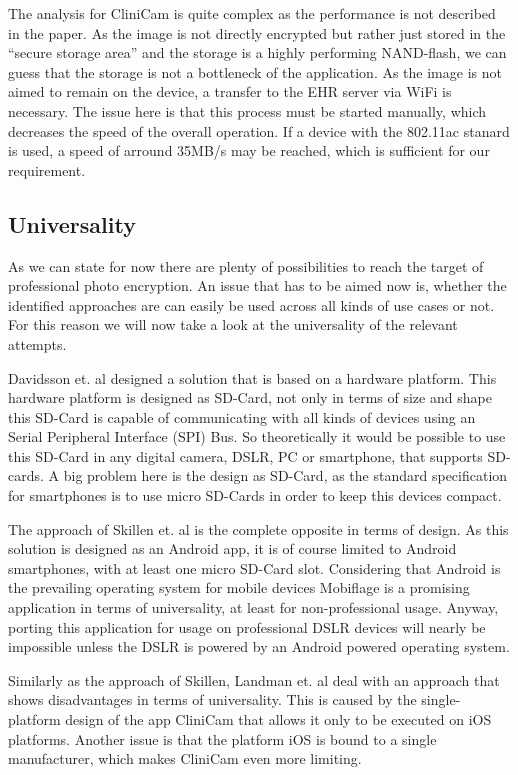 \documentclass[12pt,a4paper,titlepage,oneside]{scrartcl}
\begin{document}
The analysis for CliniCam \cite{pmid25565678} is quite complex as the performance is not described in the paper.
As the image is not directly encrypted but rather just stored in the ``secure storage area'' and the storage is a highly performing NAND-flash, we can guess that the storage is not a bottleneck of the application.
As the image is not aimed to remain on the device, a transfer to the EHR server via WiFi is necessary.
The issue here is that this process must be started manually, which decreases the speed of the overall operation.
If a device with the 802.11ac stanard is used, a speed of arround 35MB/s may be reached, which is sufficient for our requirement.

\subsection{Universality}
As we can state for now there are plenty of possibilities to reach the target of professional photo encryption.
An issue that has to be aimed now is, whether the identified approaches are can easily be used across all kinds of use cases or not.
For this reason we will now take a look at the universality of the relevant attempts.

Davidsson et. al \cite{Davidsson2016} designed a solution that is based on a hardware platform.
This hardware platform is designed as SD-Card, not only in terms of size and shape this SD-Card is capable of communicating with all kinds of devices using an Serial Peripheral Interface (SPI) Bus.
So theoretically it would be possible to use this SD-Card in any digital camera, DSLR, PC or smartphone, that supports SD-cards.
A big problem here is the design as SD-Card, as the standard specification for smartphones is to use micro SD-Cards in order to keep this devices compact.

The approach of Skillen et. al \cite{skillen2013implementing} is the complete opposite in terms of design.
As this solution is designed as an Android app, it is of course limited to Android smartphones, with at least one micro SD-Card slot.
Considering that Android is the prevailing operating system for mobile devices Mobiflage is a promising application in terms of universality, at least for non-professional usage.
Anyway, porting this application for usage on professional DSLR devices will nearly be impossible unless the DSLR is powered by an Android powered operating system.

Similarly as the approach of Skillen, Landman et. al \cite{pmid25565678} deal with an approach that shows disadvantages in terms of universality.
This is caused by the single-platform design of the app CliniCam that allows it only to be executed on iOS platforms.
Another issue is that the platform iOS is bound to a single manufacturer, which makes CliniCam even more limiting.
\end{document}
